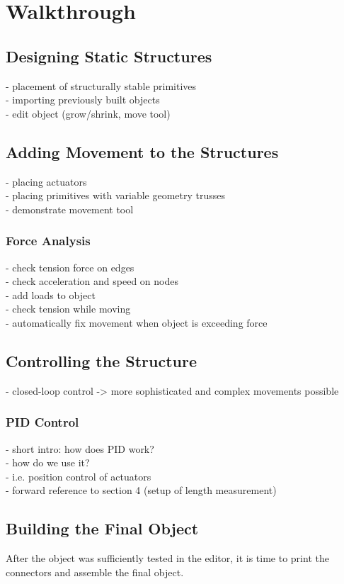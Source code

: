 \chapter{Walkthrough}\label{ch:walkthrough}
\section{Designing Static Structures}
- placement of structurally stable primitives\\
- importing previously built objects\\
- edit object (grow/shrink, move tool)
\section{Adding Movement to the Structures}
- placing actuators\\
- placing primitives with variable geometry trusses\\
- demonstrate movement tool\\
\subsection{Force Analysis}
- check tension force on edges\\
- check acceleration and speed on nodes\\
- add loads to object\\
- check tension while moving\\
- automatically fix movement when object is exceeding force\\
\section{Controlling the Structure}
- closed-loop control -> more sophisticated and complex movements possible\\
\subsection{PID Control}
- short intro: how does PID work?\\
- how do we use it?\\
- i.e. position control of actuators\\
- forward reference to section 4 (setup of length measurement)\\
\section{Building the Final Object}
After the object was sufficiently tested in the editor, it is time to print the connectors and assemble the final object.
